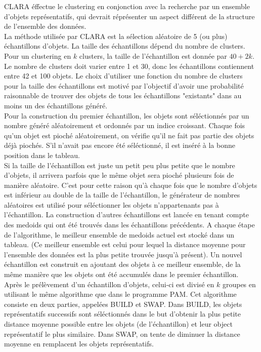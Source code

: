 \documentclass[11pt]{article}
\begin{document}
CLARA éffectue le clustering en conjonction avec la recherche par un ensemble d'objets représentatifs, qui devrait réprésenter un aspect différent de la structure de l'ensemble des données.\\
La méthode utilisée par CLARA est la sélection aléatoire de 5 (ou plus) échantillons d'objets. La taille des échantillons dépend du nombre de clusters. Pour un clustering en $k$ clusters, la taille de l'échantillon est donnée par $40+2k$. Le nombre de clusters doit varier entre 1 et 30, donc les échantillons contiennent entre 42 et 100 objets. Le choix d'utiliser une fonction du nombre de clusters pour la taille des échantillons est motivé par l'objectif d'avoir une probabilité raisonnable de trouver des objets de tous les échantillons "existants" dans au moins un des échantillons généré.\\
Pour la construction du premier échantillon, les objets sont séléctionnés par un nombre généré aléatoirement et ordonnés par un indice croissant. Chaque fois qu'un objet est pioché aléatoirement, on vérifie qu'il ne fait pas partie des objets déjà piochés. S'il n'avait pas encore été séléctionné, il est inséré à la bonne position dans le tableau.\\
Si la taille de l'échantillon est juste un petit peu plus petite que le nombre d'objets, il arrivera parfois que le même objet sera pioché  plusieurs fois de manière aléatoire. C'est pour cette raison qu'à chaque fois que le nombre d'objets est inférieur au double de la taille de l'échantillon, le générateur de nombres aléatoires est utilisé pour séléctionner les objets n'appartenants pas à l'échantillon. La construction d'autres échantillons est lancée en tenant compte des medoids qui ont été trouvés dans les échantillons précédents. A chaque étape de l'algorithme, le meilleur ensemble de medoids actuel est stocké dans un tableau. (Ce meilleur ensemble est celui pour lequel la distance moyenne pour l'ensemble des données est la plus petite trouvée jusqu'à présent). Un nouvel échantillon est construit en ajoutant des objets à ce meilleur ensemble, de la même manière que les objets ont été accumulés dans le premier échantillon.\\
Après le prélèvement d'un échantillon d'objets, celui-ci est divisé en $k$ groupes en utilisant le même algorithme que dans le programme PAM. Cet algorithme consiste en deux parties, appelées BUILD et SWAP. Dans BUILD, les objets représentatifs successifs sont séléctionnés dans le but d'obtenir la plus petite distance moyenne possible entre les objets (de l'échantillon) et leur object représentatif le plus similaire. Dans SWAP, on tente de diminuer la distance moyenne en remplacent les objets représentatifs.\\
\end{document}
